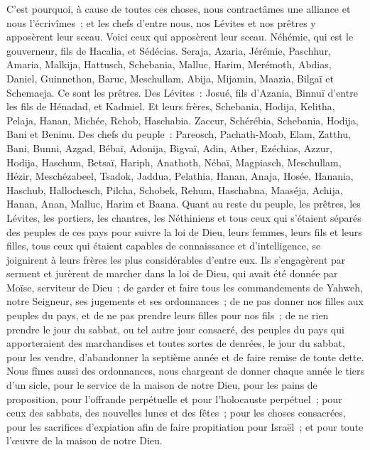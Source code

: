 \begin{multicols}{2}
C'est pourquoi, à cause de toutes ces choses, nous contractâmes une alliance et nous l'écrivîmes~; et les chefs d'entre nous, nos Lévites et nos prêtres y apposèrent leur sceau.
\VerseOne{}Voici ceux qui apposèrent leur sceau. Néhémie, qui est le gouverneur, fils de Hacalia, et Sédécias.
Seraja, Azaria, Jérémie,
Paschhur, Amaria, Malkija,
Hattusch, Schebania, Malluc,
Harim, Merémoth, Abdias,
Daniel, Guinnethon, Baruc,
Meschullam, Abija, Mijamin,
Maazia, Bilgaï et Schemaeja. Ce sont les prêtres.
Des Lévites~: Josué, fils d'Azania, Binnuï d'entre les fils de Hénadad, et Kadmiel.
Et leurs frères, Schebania, Hodija, Kelitha, Pelaja, Hanan,
Michée, Rehob, Haschabia.
Zaccur, Schérébia, Schebania,
Hodija, Bani et Beninu.
Des chefs du peuple~: Pareosch, Pachath-Moab, Elam, Zatthu, Bani,
Bunni, Azgad, Bébaï,
Adonija, Bigvaï, Adin,
Ather, Ezéchias, Azzur,
Hodija, Haschum, Betsaï,
Hariph, Anathoth, Nébaï,
Magpiasch, Meschullam, Hézir,
Meschézabeel, Tsadok, Jaddua,
Pelathia, Hanan, Anaja,
Hosée, Hanania, Haschub,
Hallochesch, Pilcha, Schobek,
Rehum, Haschabna, Maaséja,
Achija, Hanan, Anan,
Malluc, Harim et Baana.
Quant au reste du peuple, les prêtres, les Lévites, les portiers, les chantres, les Néthiniens et tous ceux qui s'étaient séparés des peuples de ces pays pour suivre la loi de Dieu, leurs femmes, leurs fils et leurs filles, tous ceux qui étaient capables de connaissance et d'intelligence,
se joignirent à leurs frères les plus considérables d'entre eux. Ils s'engagèrent par serment et jurèrent de marcher dans la loi de Dieu, qui avait été donnée par Moïse, serviteur de Dieu~; de garder et faire tous les commandements de Yahweh, notre Seigneur, ses jugements et ses ordonnances~;
de ne pas donner nos filles aux peuples du pays, et de ne pas prendre leurs filles pour nos fils~;
de ne rien prendre le jour du sabbat, ou tel autre jour consacré, des peuples du pays qui apporteraient des marchandises et toutes sortes de denrées, le jour du sabbat, pour les vendre, d'abandonner la septième année et de faire remise de toute dette.
Nous fîmes aussi des ordonnances, nous chargeant de donner chaque année le tiers d'un sicle, pour le service de la maison de notre Dieu,
pour les pains de proposition, pour l'offrande perpétuelle et pour l'holocauste perpétuel~; pour ceux des sabbats, des nouvelles lunes et des fêtes~; pour les choses consacrées, pour les sacrifices d'expiation afin de faire propitiation pour Israël~; et pour toute l'œuvre de la maison de notre Dieu.

\end{multicols}
